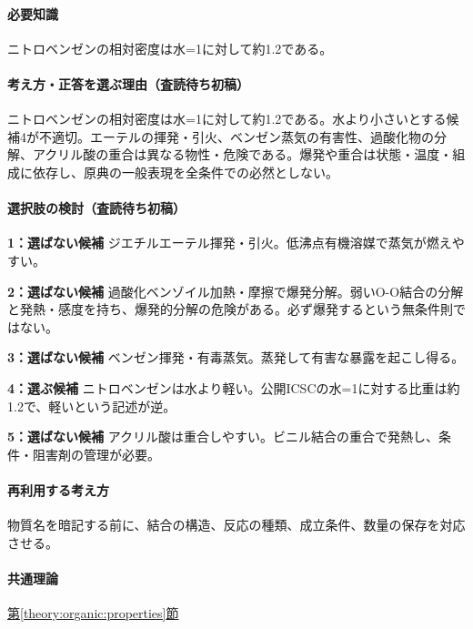 \paragraph{必要知識} ニトロベンゼンの相対密度は水=1に対して約1.2である。

\paragraph{考え方・正答を選ぶ理由（査読待ち初稿）} ニトロベンゼンの相対密度は水=1に対して約1.2である。水より小さいとする候補4が不適切。エーテルの揮発・引火、ベンゼン蒸気の有害性、過酸化物の分解、アクリル酸の重合は異なる物性・危険である。爆発や重合は状態・温度・組成に依存し、原典の一般表現を全条件での必然としない。

\paragraph{選択肢の検討（査読待ち初稿）}\mbox{}\par

\noindent\textbf{1：選ばない候補} ジエチルエーテル揮発・引火。低沸点有機溶媒で蒸気が燃えやすい。\par

\noindent\textbf{2：選ばない候補} 過酸化ベンゾイル加熱・摩擦で爆発分解。弱いO-O結合の分解と発熱・感度を持ち、爆発的分解の危険がある。必ず爆発するという無条件則ではない。\par

\noindent\textbf{3：選ばない候補} ベンゼン揮発・有毒蒸気。蒸発して有害な暴露を起こし得る。\par

\noindent\textbf{4：選ぶ候補} ニトロベンゼンは水より軽い。公開ICSCの水=1に対する比重は約1.2で、軽いという記述が逆。\par

\noindent\textbf{5：選ばない候補} アクリル酸は重合しやすい。ビニル結合の重合で発熱し、条件・阻害剤の管理が必要。\par

\paragraph{再利用する考え方} 物質名を暗記する前に、結合の構造、反応の種類、成立条件、数量の保存を対応させる。

\paragraph{共通理論} \hyperref[theory:organic:properties]{第\ref*{theory:organic:properties}節}

